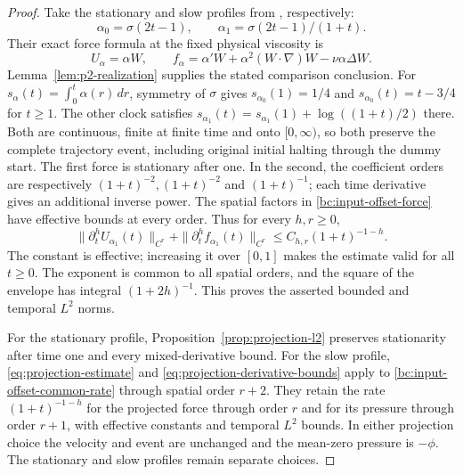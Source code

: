 \begin{proof}
Take the stationary and slow profiles from
\cite[Section~5 and Proposition~6.1]{OpenAI379StationaryA2}, respectively:
\begin{equation}\label{bc:input-offset-profiles}
 \alpha_0=\sigma(2t-1),\qquad \alpha_1=\sigma(2t-1)/(1+t).
\end{equation}
Their exact force formula at the fixed physical viscosity is
\begin{equation}\label{bc:input-offset-force}
 U_\alpha=\alpha W,\qquad
 f_\alpha=\alpha'W+\alpha^2(W\cdot\nabla)W-\nu\alpha\Delta W.
\end{equation}
Lemma~\ref{lem:p2-realization} supplies the stated comparison conclusion.
For $s_\alpha(t)=\int_0^t\alpha(r)\,dr$, symmetry of $\sigma$ gives
$s_{\alpha_0}(1)=1/4$ and $s_{\alpha_0}(t)=t-3/4$ for $t\ge1$.
The other clock satisfies
$s_{\alpha_1}(t)=s_{\alpha_1}(1)+\log((1+t)/2)$ there. Both are
continuous, finite at finite time and onto $[0,\infty)$, so both preserve
the complete trajectory event, including original initial halting through
the dummy start. The first force is stationary after one. In the second,
the coefficient orders are respectively $(1+t)^{-2},(1+t)^{-2}$ and
$(1+t)^{-1}$; each time derivative gives an additional inverse power.
The spatial factors in \eqref{bc:input-offset-force} have effective
bounds at every order. Thus for every $h,r\ge0$,
\begin{equation}\label{bc:input-offset-common-rate}
 \|\partial_t^h U_{\alpha_1}(t)\|_{C^r}
 +\|\partial_t^h f_{\alpha_1}(t)\|_{C^r}
 \le C_{h,r}(1+t)^{-1-h}.
\end{equation}
The constant is effective; increasing it over $[0,1]$ makes the estimate
valid for all $t\ge0$. The exponent is common to all spatial orders,
and the square of the envelope has integral $(1+2h)^{-1}$.
This proves the asserted bounded and temporal $L^2$ norms.

For the stationary profile, Proposition~\ref{prop:projection-l2}
preserves stationarity after time one and every mixed-derivative bound.
For the slow profile, \eqref{eq:projection-estimate} and
\eqref{eq:projection-derivative-bounds} apply to
\eqref{bc:input-offset-common-rate} through spatial order $r+2$.
They retain the rate $(1+t)^{-1-h}$ for the projected force through
order $r$ and for its pressure through order $r+1$, with effective
constants and temporal $L^2$ bounds. In either projection choice the
velocity and event are unchanged and the mean-zero pressure is
$-\phi$. The stationary and slow profiles remain separate choices.
\end{proof}
